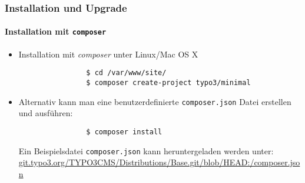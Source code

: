 \begin{frame}[fragile]
	\frametitle{Installation und Upgrade}
	\framesubtitle{Installation mit \texttt{composer}}

	\begin{itemize}
		\item Installation mit \textit{composer} unter Linux/Mac OS X

			\begin{lstlisting}
				$ cd /var/www/site/
				$ composer create-project typo3/minimal
			\end{lstlisting}

		\item Alternativ kann man eine benutzerdefinierte \texttt{composer.json} Datei erstellen und ausführen:

			\begin{lstlisting}
				$ composer install
			\end{lstlisting}

			Ein Beispielsdatei \texttt{composer.json} kann heruntergeladen werden unter:\newline
			\small
				\href{https://git.typo3.org/TYPO3CMS/Distributions/Base.git/blob/HEAD:/composer.json}{git.typo3.org/TYPO3CMS/Distributions/Base.git/blob/HEAD:/composer.json}
			\normalsize

	\end{itemize}
\end{frame}

